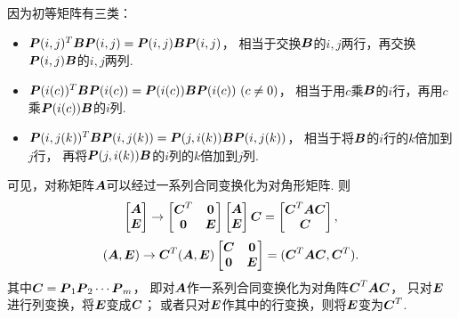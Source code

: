 \begin{theorem}
因为初等矩阵有三类：\begin{itemize}
	\item \(\boldsymbol{P}(i,j)^T\boldsymbol{B}\boldsymbol{P}(i,j)=\boldsymbol{P}(i,j)\boldsymbol{B}\boldsymbol{P}(i,j)\)，
	相当于交换\(\boldsymbol{B}\)的\(i,j\)两行，再交换\(\boldsymbol{P}(i,j)\boldsymbol{B}\)的\(i,j\)两列.
	\item \(\vb{P}(i(c))^T\vb{B}\vb{P}(i(c))=\vb{P}(i(c))\vb{B}\vb{P}(i(c))\ (c \neq 0)\)，
	相当于用\(c\)乘\(\boldsymbol{B}\)的\(i\)行，再用\(c\)乘\(\boldsymbol{P}(i(c))\boldsymbol{B}\)的\(i\)列.
	\item \(\boldsymbol{P}(i,j(k))^T\boldsymbol{B}\boldsymbol{P}(i,j(k))=\boldsymbol{P}(j,i(k))\boldsymbol{B}\boldsymbol{P}(i,j(k))\)，
	相当于将\(\boldsymbol{B}\)的\(i\)行的\(k\)倍加到\(j\)行，
	再将\(\boldsymbol{P}(j,i(k))\boldsymbol{B}\)的\(i\)列的\(k\)倍加到\(j\)列.
\end{itemize}
可见，对称矩阵\(\boldsymbol{A}\)可以经过一系列合同变换化为对角形矩阵.
则\begin{equation*}
	\begin{bmatrix} \boldsymbol{A} \\ \boldsymbol{E} \end{bmatrix}
	\to
	\begin{bmatrix} \boldsymbol{C}^T & \boldsymbol0 \\ \boldsymbol0 & \boldsymbol{E} \end{bmatrix}
	\begin{bmatrix} \boldsymbol{A} \\ \boldsymbol{E} \end{bmatrix}
	\boldsymbol{C}
	= \begin{bmatrix} \boldsymbol{C}^T\boldsymbol{A}\boldsymbol{C} \\ \boldsymbol{C} \end{bmatrix},
\end{equation*}\begin{equation*}
	(\boldsymbol{A},\boldsymbol{E})
	\to
	\boldsymbol{C}^T (\boldsymbol{A},\boldsymbol{E}) \begin{bmatrix}
		\boldsymbol{C} & \boldsymbol0 \\
		\boldsymbol0 & \boldsymbol{E}
	\end{bmatrix}
	= (\boldsymbol{C}^T\boldsymbol{A}\boldsymbol{C},\boldsymbol{C}^T).
\end{equation*}
其中\(\boldsymbol{C}=\boldsymbol{P}_1\boldsymbol{P}_2\dotsm\boldsymbol{P}_m\)，
即对\(\boldsymbol{A}\)作一系列合同变换化为对角阵\(\boldsymbol{C}^T\boldsymbol{A}\boldsymbol{C}\)，
只对\(\boldsymbol{E}\)进行列变换，将\(\boldsymbol{E}\)变成\(\boldsymbol{C}\)；
或者只对\(\boldsymbol{E}\)作其中的行变换，则将\(\boldsymbol{E}\)变为\(\boldsymbol{C}^T\).
\end{theorem}

